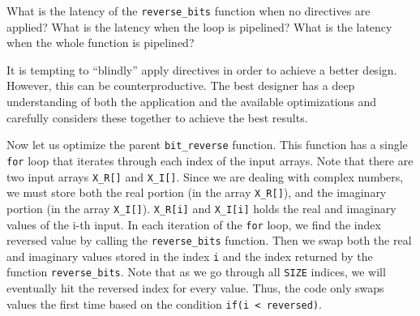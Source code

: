 \begin{exercise}
What is the latency of the \lstinline|reverse_bits| function when no directives are applied? What is the latency when the loop is pipelined?  What is the latency when the whole function is pipelined?
\end{exercise}

\begin{aside}
It is tempting to ``blindly'' apply directives in order to achieve a better design. However, this can be counterproductive. The best designer has a deep understanding of both the application and the available optimizations and carefully considers these together to achieve the best results. 
\end{aside}

Now let us optimize the parent \lstinline|bit_reverse| function. This function has a single \lstinline{for} loop that iterates through each index of the input arrays. Note that there are two input arrays \lstinline{X_R[]} and \lstinline{X_I[]}. Since we are dealing with complex numbers, we must store both the real portion (in the array \lstinline{X_R[]}), and the imaginary portion (in the array \lstinline{X_I[]}). \lstinline{X_R[i]} and \lstinline{X_I[i]} holds the real and imaginary values of the i-th input.
In each iteration of the \lstinline{for} loop, we find the index reversed value by calling the \lstinline{reverse_bits} function. Then we swap both the real and imaginary values stored in the index \lstinline{i} and the index returned by the function \lstinline{reverse_bits}. Note that as we go through all \lstinline{SIZE} indices, we will eventually hit the reversed index for every value. Thus, the code only swaps values the first time based on the condition \lstinline{if(i < reversed)}.


